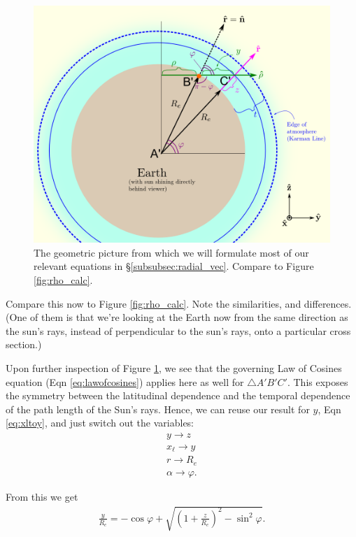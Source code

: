 \documentclass[10pt]{article}
\begin{document}
\begin{figure}[!h]
	\centering
		\includegraphics[width=160mm]{sphere_rhat2.png}
	\caption{The geometric picture from which we will formulate most of our relevant equations in \S \ref{subsubsec:radial_vec}. Compare to Figure \ref{fig:rho_calc}.}
	\label{fig:r_calc}
\end{figure}

\vspace{10pt}
Compare this now to Figure \ref{fig:rho_calc}. Note the similarities, and differences. (One of them is that we're looking at the Earth now from the same direction as the sun's rays, instead of perpendicular to the sun's rays, onto a particular cross section.)

\vspace{10pt} Upon further inspection of Figure \ref{fig:r_calc}, we see that the governing Law of Cosines equation (Eqn \eqref{eq:lawofcosines}) applies here as well for $\bigtriangleup A'B'C'$. This exposes the symmetry between the latitudinal dependence and the temporal dependence of the path length of the Sun's rays. Hence, we can reuse our result for $y$, Eqn \eqref{eq:xltoy}, and just switch out the variables:
\begin{gather*}
y \rightarrow z \\
x_{\ell} \rightarrow y \\
r \rightarrow R_e \\
\alpha \rightarrow \varphi.
\end{gather*}

From this we get
\begin{align}\label{eq:ytoz}
\frac{y}{R_e} = -\cos \varphi + \sqrt{\left(1 + \frac{z}{R_e}\right)^2 - \sin^2 \varphi}.
\end{align}
\end{document}
